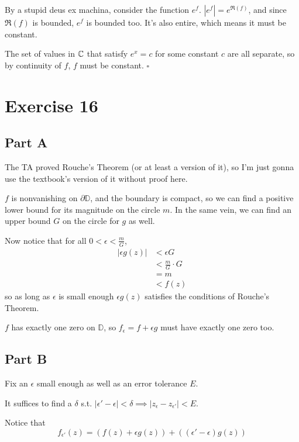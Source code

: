 \documentclass[12pt]{article}
\begin{document}
By a stupid deus ex machina, consider the function $e^f$.
$\left|e^f\right|=e^{\Re(f)}$, and since $\Re(f)$ is bounded, $e^f$ is bounded too.
It's also entire, which means it must be constant.

The set of values in $\mathbb{C}$ that satisfy $e^x=c$ for some constant $c$
are all separate, so by continuity of $f$, $f$ must be constant. $\square$

\pagebreak

\section{Exercise 16}

\subsection{Part A}

The TA proved Rouche's Theorem (or at least a version of it), so I'm just gonna use
the textbook's version of it without proof here.

$f$ is nonvanishing on $\partial \mathbb{D}$, and the boundary is compact, so
we can find a positive lower bound for its magnitude on the circle $m$.
In the same vein, we can find an upper bound $G$ on the circle for $g$ as well.

Now notice that for all $0 < \epsilon < \frac{m}{G}$,
\begin{align*}
  |\epsilon g(z)| 
  &< \epsilon G \\
  &< \frac{m}{G} \cdot G \\
  &= m \\
  &< f(z)
\end{align*}
so as long as $\epsilon$ is small enough $\epsilon g(z)$ satisfies the conditions
of Rouche's Theorem.

$f$ has exactly one zero on $\mathbb{D}$, so $f_\epsilon=f+\epsilon g$ must have exactly one zero too.

\subsection{Part B}

Fix an $\epsilon$ small enough as well as an error tolerance $E$.

It suffices to find a $\delta$ s.t. $|\epsilon'-\epsilon| < \delta \implies |z_\epsilon - z_{\epsilon'}| < E$.

Notice that
\[f_{\epsilon'}(z) = (f(z) + \epsilon g(z)) + ((\epsilon' - \epsilon)g(z))\]
\end{document}

